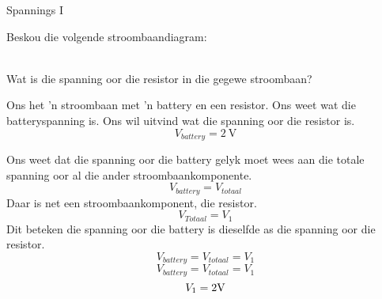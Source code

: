 \begin{wex}{Spannings I}{
Beskou die volgende stroombaandiagram:\\
\begin{center}
\end{center}\\
Wat is die spanning oor die resistor in die gegewe stroombaan?
}{%
Ons het 'n stroombaan met 'n battery en een resistor. Ons weet wat die
batteryspanning is. Ons wil uitvind wat die spanning oor die resistor is.
\begin{equation*}
V_{battery} = 2~\text{V}
\end{equation*}

Ons weet dat die spanning oor die battery gelyk moet wees aan die totale
spanning oor al die ander stroombaankomponente.
\begin{equation*}
V_{battery} = V_{totaal}
\end{equation*}
Daar is net een stroombaankomponent, die resistor.
\begin{equation*}
V_{Totaal} = V_{1}
\end{equation*}
Dit beteken die spanning oor die battery is dieselfde as die spanning oor
die resistor.
\begin{equation*}
V_{battery} = V_{totaal} = V_{1}
\end{equation*}
\begin{equation*}
V_{battery} = V_{totaal} = V_{1}
\end{equation*}
\begin{equation*}
V_{1} = 2\rm{V}
\end{equation*}}\end{wex}

